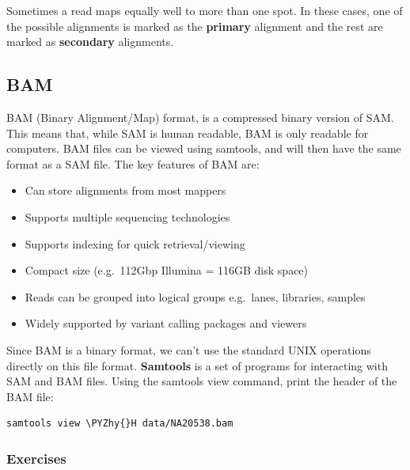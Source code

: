 \documentclass[11pt]{article}
\makeatletter
\providecommand{\tightlist}{%
      \setlength{\itemsep}{0pt}\setlength{\parskip}{0pt}}
\def\PYZhy{\char`\-}
\newcommand{\boxspacing}{\kern\kvtcb@left@rule\kern\kvtcb@boxsep}
\newcommand{\prompt}[4]{
        {\ttfamily\llap{{\color{blue}\LARGE\faKeyboardO\hspace{3pt}#4}}\vspace{-\baselineskip}}
    }
\makeatother
\begin{document}
Sometimes a read maps equally well to more than one spot. In these
cases, one of the possible alignments is marked as the \textbf{primary}
alignment and the rest are marked as \textbf{secondary} alignments.

\hypertarget{bam}{%
\subsection{BAM}\label{bam}}

BAM (Binary Alignment/Map) format, is a compressed binary version of
SAM. This means that, while SAM is human readable, BAM is only readable
for computers. BAM files can be viewed using samtools, and will then
have the same format as a SAM file. The key features of BAM are:

\begin{itemize}
\tightlist
\item
  Can store alignments from most mappers
\item
  Supports multiple sequencing technologies
\item
  Supports indexing for quick retrieval/viewing
\item
  Compact size (e.g.~112Gbp Illumina = 116GB disk space)
\item
  Reads can be grouped into logical groups e.g.~lanes, libraries,
  samples
\item
  Widely supported by variant calling packages and viewers
\end{itemize}

    Since BAM is a binary format, we can't use the standard UNIX operations
directly on this file format. \textbf{Samtools} is a set of programs for
interacting with SAM and BAM files. Using the samtools view command,
print the header of the BAM file:

    \begin{tcolorbox}[breakable, size=fbox, boxrule=1pt, pad at break*=1mm,colback=cellbackground, colframe=cellborder]
\prompt{In}{incolor}{ }{\boxspacing}
\begin{Verbatim}[commandchars=\\\{\}]
samtools view \PYZhy{}H data/NA20538.bam
\end{Verbatim}
\end{tcolorbox}

    \hypertarget{exercises}{%
\subsubsection{Exercises}\label{exercises}}
\end{document}
